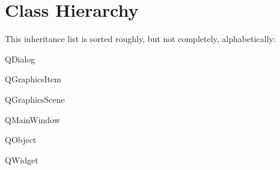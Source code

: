 \section{Class Hierarchy}
This inheritance list is sorted roughly, but not completely, alphabetically\+:\begin{DoxyCompactList}
\item {}
\item {}
\item Q\+Dialog\begin{DoxyCompactList}
\item {}
\end{DoxyCompactList}
\item Q\+Graphics\+Item\begin{DoxyCompactList}
\item {}
\begin{DoxyCompactList}
\item {}
\end{DoxyCompactList}
\end{DoxyCompactList}
\item Q\+Graphics\+Scene\begin{DoxyCompactList}
\item {}
\end{DoxyCompactList}
\item Q\+Main\+Window\begin{DoxyCompactList}
\item {}
\end{DoxyCompactList}
\item Q\+Object\begin{DoxyCompactList}
\item {}
\item {}
\item {}
\end{DoxyCompactList}
\item Q\+Widget\begin{DoxyCompactList}

\end{DoxyCompactList}
\end{DoxyCompactList}
